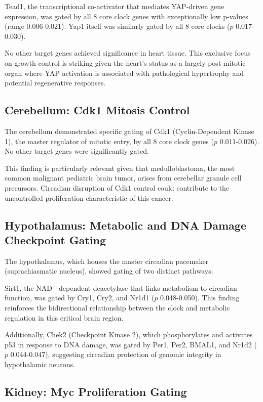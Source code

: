 \documentclass[10pt,letterpaper]{article}
\begin{document}
Tead1, the transcriptional co-activator that mediates YAP-driven gene expression, was gated by all 8 core clock genes with exceptionally low p-values (range 0.006-0.021). Yap1 itself was similarly gated by all 8 core clocks ($p$ 0.017-0.030).

No other target genes achieved significance in heart tissue. This exclusive focus on growth control is striking given the heart's status as a largely post-mitotic organ where YAP activation is associated with pathological hypertrophy and potential regenerative responses.

\subsection{Cerebellum: Cdk1 Mitosis Control}

The cerebellum demonstrated specific gating of Cdk1 (Cyclin-Dependent Kinase 1), the master regulator of mitotic entry, by all 8 core clock genes ($p$ 0.011-0.026). No other target genes were significantly gated.

This finding is particularly relevant given that medulloblastoma, the most common malignant pediatric brain tumor, arises from cerebellar granule cell precursors. Circadian disruption of Cdk1 control could contribute to the uncontrolled proliferation characteristic of this cancer.

\subsection{Hypothalamus: Metabolic and DNA Damage Checkpoint Gating}

The hypothalamus, which houses the master circadian pacemaker (suprachiasmatic nucleus), showed gating of two distinct pathways:

Sirt1, the NAD$^+$-dependent deacetylase that links metabolism to circadian function, was gated by Cry1, Cry2, and Nr1d1 ($p$ 0.048-0.050). This finding reinforces the bidirectional relationship between the clock and metabolic regulation in this critical brain region.

Additionally, Chek2 (Checkpoint Kinase 2), which phosphorylates and activates p53 in response to DNA damage, was gated by Per1, Per2, BMAL1, and Nr1d2 ($p$ 0.044-0.047), suggesting circadian protection of genomic integrity in hypothalamic neurons.

\subsection{Kidney: Myc Proliferation Gating}
\end{document}
